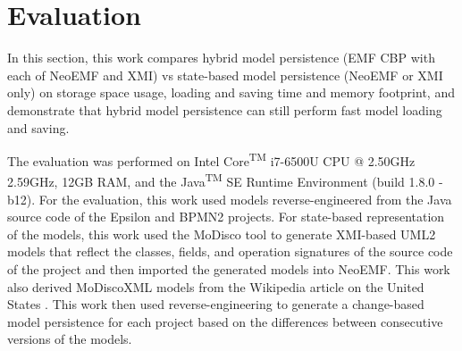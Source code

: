 \section{Evaluation}
\label{sec:evaluation_5}
In this section, this work compares hybrid model persistence (EMF CBP with each of NeoEMF and XMI) vs state-based model persistence (NeoEMF or XMI only) on storage space usage, loading and saving time and memory footprint, and demonstrate that hybrid model persistence can still perform fast model loading and saving. 

The evaluation was performed on Intel\textsuperscript{\textregistered} Core\textsuperscript{TM} i7-6500U CPU @ 2.50GHz 2.59GHz, 12GB RAM, and the Java\textsuperscript{TM} SE Runtime Environment (build 1.8.0 -b12). For the evaluation, this work used models reverse-engineered from the Java source code of the Epsilon \cite{eclipse2017epsilon,eclipse2018epsilongit} and BPMN2 \cite{eclipse2017bpmn2} projects. For state-based representation of the models, this work used the MoDisco tool \cite{DBLP:journals/infsof/BruneliereCDM14} to generate XMI-based UML2 \cite{eclipse2017uml2} models that reflect the classes, fields, and operation signatures of the source code of the project and then imported the generated models into NeoEMF. This work also derived MoDiscoXML models \cite{eclipse2018modiscoxml} from the Wikipedia article on the United States \cite{wikipedia2018us}. This work then used reverse-engineering to generate a change-based model persistence for each project based on the differences between consecutive versions of the models.

